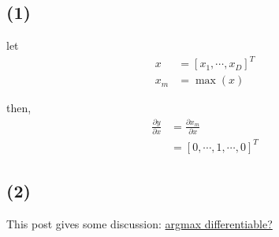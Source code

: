 \documentclass{subfiles}
\begin{document}
\subsection*{(1)}

let
\begin{align*}
x & = [x_1, \cdots, x_D]^T \\
x_m & = \max(x) 
\end{align*}

then,
\begin{align*}
\frac{\partial y}{\partial x}
& = \frac{\partial x_m}{\partial x} \\
& = [0, \cdots, 1, \cdots, 0]^T
\end{align*}

\subsection*{(2)}

This post gives some discussion: \href{https://www.reddit.com/r/MachineLearning/comments/4e2get/argmax_differentiable/}{argmax differentiable?}
\end{document}
